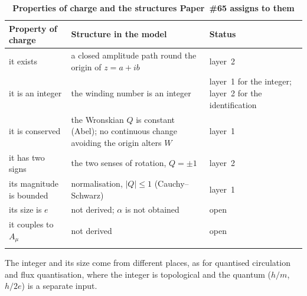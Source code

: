 \documentclass[%
 reprint, amsmath,amssymb, aps, prb, ]{revtex4-2}
\numberwithin{equation}{section}
\begin{document}
\begin{table}[t!]
\centering
\caption{\textbf{Properties of charge and the structures Paper~\#65 assigns to them}}
\label{tab:g_charge}
\renewcommand{\arraystretch}{1.4}
\setlength{\tabcolsep}{8pt}
\begin{tabular}{>{\raggedright\arraybackslash}p{3.4cm}>{\raggedright\arraybackslash}p{5.6cm}>{\raggedright\arraybackslash}p{5.6cm}}
\toprule
\textbf{Property of charge} & \textbf{Structure in the model} & \textbf{Status} \\
\midrule
it exists & a closed amplitude path round the origin of $z = a + ib$ & \textcolor{kB}{layer~2} \\
\addlinespace[0.3cm]
it is an integer & the winding number is an integer & \textcolor{pass}{layer~1} for the integer; \textcolor{kB}{layer~2} for the identification \\
\addlinespace[0.3cm]
it is conserved & the Wronskian $Q$ is constant (Abel); no continuous change avoiding the origin alters $W$ & \textcolor{pass}{layer~1} \\
\addlinespace[0.3cm]
it has two signs & the two senses of rotation, $Q = \pm1$ & \textcolor{kB}{layer~2} \\
\addlinespace[0.3cm]
its magnitude is bounded & normalisation, $\lvert Q\rvert \le 1$ (Cauchy--Schwarz) & \textcolor{pass}{layer~1} \\
\addlinespace[0.3cm]
its size is $e$ & not derived; $\alpha$ is not obtained & \textcolor{fail}{open} \\
\addlinespace[0.3cm]
it couples to $A_\mu$ & not derived & \textcolor{fail}{open} \\
\addlinespace[0.2cm]
\bottomrule
\end{tabular}
\vspace{0.2cm}
\begin{minipage}{0.95\textwidth}
\justifying\footnotesize
The integer and its size come from different places, as for quantised circulation and flux quantisation, where the integer is topological and the quantum ($h/m$, $h/2e$) is a separate input.
\end{minipage}
\end{table}
\end{document}
